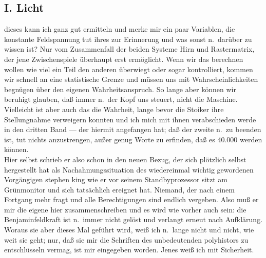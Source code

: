 \documentclass[
]{article}
\author{}
\date{\vspace{-2.5em}}
\begin{document}
\subsection{I. Licht}\label{i.-licht}

dieses kann ich ganz gut ermitteln und merke mir ein paar Variablen, die
konstante Feldspannung tut ihres zur Erinnerung und was sonst n.~darüber
zu wissen ist? Nur vom Zusammenfall der beiden Systeme Hirn und
Rastermatrix, der jene Zwischenspiele überhaupt erst ermöglicht. Wenn
wir das berechnen wollen wie viel ein Teil den anderen überwiegt oder
sogar kontrolliert, kommen wir schnell an eine statistische Grenze und
müssen uns mit Wahrscheinlichkeiten begnügen über den eigenen
Wahrheitsanspruch. So lange aber können wir beruhigt glauben, daß immer
n.~der Kopf uns steuert, nicht die Maschine. Vielleicht ist aber auch
das die Wahrheit, lange bevor die Stoiker ihre Stellungnahme verweigern
konnten und ich mich mit ihnen verabschieden werde in den dritten Band
--- der hiermit angefangen hat; daß der zweite n.~zu beenden ist, tut
nichts anzustrengen, außer genug Worte zu erfinden, daß es 40.000 werden
können.\\
Hier selbst schrieb er also schon in den neuen Bezug, der sich plötzlich
selbst hergestellt hat als Nachahmungssituation des wiedereinmal wichtig
gewordenen Vorgängigen stephen king wie er vor seinem Standbyprozessor
sitzt am Grünmonitor und sich tatsächlich ereignet hat. Niemand, der
nach einem Fortgang mehr fragt und alle Berechtigungen sind endlich
vergeben. Also muß er mir die eigene hier zusammenschreiben und es wird
wie vorher auch sein: die Benjaminfeldkraft ist n.~immer nicht gelöst
und verlangt erneut nach Aufklärung. Woraus sie aber dieses Mal geführt
wird, weiß ich n.~lange nicht und nicht, wie weit sie geht; nur, daß sie
mir die Schriften des unbedeutenden polyhistors zu entschlüsseln vermag,
ist mir eingegeben worden. Jenes weiß ich mit Sicherheit.
\end{document}
